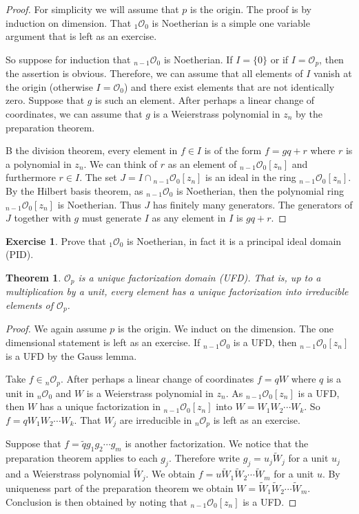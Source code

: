 \documentclass[12pt,openany]{book}
\newcommand{\sO}{{\mathcal{O}}}
\theoremstyle{plain}
\newtheorem{thm}{Theorem}[section]
\theoremstyle{remark}
\theoremstyle{definition}
\theoremstyle{exercise}
\newtheorem{exercise}{Exercise}[section]
\theoremstyle{example}
\begin{document}
\begin{proof}
For simplicity we will assume that $p$ is the origin.  The proof is by
induction on dimension.  That ${}_1\sO_0$ is Noetherian is a simple one
variable argument that is left as an exercise.

So suppose for induction that ${}_{n-1}\sO_0$ is Noetherian.  If $I = \{ 0 \}$
or if $I = \sO_p$, then the assertion is obvious.  Therefore, we can assume
that all elements of $I$ vanish at the origin (otherwise $I = \sO_0$) and
there exist elements that are not identically zero.  Suppose that $g$
is such an element.  After perhaps a linear change of coordinates, we can
assume that $g$ is a Weierstrass polynomial in $z_n$
by the preparation theorem.

B the division theorem,
every element in $f \in I$ is of the form $f = gq+r$ where $r$
is a polynomial in $z_n$.  We can think of
$r$ as an element of ${}_{n-1}\sO_0[z_n]$ and furthermore $r \in I$.
The set $J= I \cap {}_{n-1}\sO_0[z_n]$ is an ideal in the
ring ${}_{n-1}\sO_0[z_n]$.  By the Hilbert basis theorem, as
${}_{n-1}\sO_0$ is Noetherian, then the polynomial ring
${}_{n-1}\sO_0[z_n]$ is Noetherian.  Thus $J$ has finitely many generators.
The generators of $J$ together with $g$ must generate $I$ as any
element in $I$ is $gq+r$.
\end{proof}

\begin{exercise}
Prove that ${}_1\sO_0$ is Noetherian, in fact it is a principal ideal domain
(PID).
\end{exercise}

\begin{thm}
$\sO_p$ is a unique factorization domain (UFD).  That is, up to a
multiplication by a unit, every element has a unique factorization into
irreducible elements of $\sO_p$.
\end{thm}

\begin{proof}
We again assume $p$ is the origin.
We induct on the dimension.  The one dimensional statement is left
as an exercise.  If ${}_{n-1}\sO_0$ is a UFD, then
${}_{n-1}\sO_0[z_n]$ is a UFD by the Gauss lemma.

Take $f \in {}_n\sO_p$.  After perhaps a linear change of coordinates
$f = qW$ where $q$ is a unit in ${}_n\sO_0$
and $W$ is a Weierstrass polynomial in $z_n$.
As 
${}_{n-1}\sO_0[z_n]$ is a UFD, then $W$ has a unique
factorization in 
${}_{n-1}\sO_0[z_n]$ into $W = W_1 W_2 \cdots W_k$.
So $f = q W_1 W_2 \cdots W_k$.  That $W_j$ are irreducible
in ${}_n\sO_p$ is left as an exercise.

Suppose that
$f = \tilde{q} g_1 g_2 \cdots g_m$ is another factorization.  We notice that
the preparation theorem applies to each $g_j$.  Therefore write
$g_j = u_j \tilde{W}_j$ for a unit $u_j$ and a Weierstrass polynomial
$\tilde{W}_j$.  We obtain
$f = u \tilde{W}_1 \tilde{W}_2 \cdots \tilde{W}_m$ for a unit $u$.  By
uniqueness part of the preparation theorem we obtain
$W = \tilde{W}_1 \tilde{W}_2 \cdots \tilde{W}_m$.  Conclusion is then
obtained by noting that
${}_{n-1}\sO_0[z_n]$ is a UFD.
\end{proof}
\end{document}
